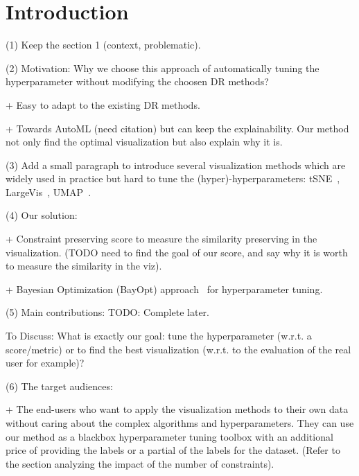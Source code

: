 \section{Introduction}

\par
(1) Keep the section 1 (context, problematic).


\vspace{8pt}
\par (2) Motivation: Why we choose this approach of automatically tuning the hyperparameter without modifying the choosen DR methods?

+ Easy to adapt to the existing DR methods. 

+ Towards AutoML (need citation) but can keep the explainability. Our method not only find the optimal visualization but also explain why it is.


\vspace{8pt} \par
(3) Add a small paragraph to introduce several visualization methods which are widely used in practice but hard to tune the (hyper)-hyperparameters:
tSNE~\cite{maaten2008tsne}, LargeVis~\cite{tang2016visualizing}, UMAP~\cite{mcinnes2018umap}.

\vspace{8pt} \par
(4) Our solution:

+ Constraint preserving score to measure the similarity preserving in the visualization. (TODO need to find the goal of our score, and say why it is worth to measure the similarity in the viz).

+ Bayesian Optimization (BayOpt) approach~\cite{mockus1978application, brochu2010tutorial} for hyperparameter tuning.

\vspace{8pt} \par
(5) Main contributions: 
TODO: Complete later.

To Discuss: What is exactly our goal: tune the hyperparameter (w.r.t. a score/metric) or to find the best visualization (w.r.t. to the evaluation of the real user for example)?

\vspace{8pt}
\par
(6) The target audiences:

+ The end-users who want to apply the visualization methods to their own data without caring about the complex algorithms and hyperparameters.
They can use our method as a blackbox hyperparameter tuning toolbox with an additional price of providing the labels or a partial of the labels for the dataset.
(Refer to the section analyzing the impact of the number of constraints).

